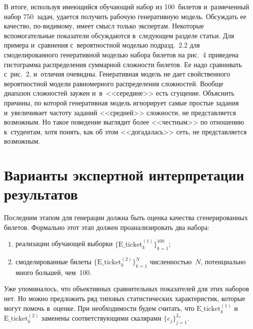 \begin{multicols}{2}
  В итоге, используя имеющийся обучающий набор из 100~билетов 
и~размеченный набор 750~задач, удается получить рабочую генеративную 
модель. Обсуждать ее качество, по-ви\-ди\-мо\-му, имеет смысл только 
экспертам. Некоторые вспомогательные показатели обсуждаются 
в~следующем разделе статьи. Для примера и~сравнения с~вероятностной 
моделью подразд.~2.2 для смоделированного генеративной моделью набора 
билетов на рис.~4 приведена гистограмма распределения суммарной 
сложности билетов. Ее надо сравнивать с~рис.~2, и~отличия очевидны. 
Генеративная модель не дает свойственного вероятностной модели 
равномерного распределения сложностей. Вообще диапазон сложностей 
заужен и~в~<<середине>> есть сгущение. Объяснить причины, по которой 
генеративная модель игнорирует самые простые задания и~увеличивает 
частоту заданий <<сред\-ней>> слож\-ности, не представляется возможным. 
Но такое поведение выглядит более <<чест\-ным>> по отношению 
к~студентам, хотя понять, как об этом <<догадалась>> сеть, не 
представляется возможным.
  
  
 
  
\section{Варианты экспертной интерпретации результатов}

  Последним этапом для генерации должна быть оценка качества 
сгенерированных билетов. Формально этот этап должен проанализировать 
два набора: 
\begin{enumerate}[(1)]
\item реализации обуча\-ющей выборки 
$\{\mathrm{E\_ticket}_k^{(1)}\}_{k=1}^{100}$;
\item смоделированные билеты 
$\{\mathrm{E\_ticket}_k^{(2)}\}^N_{k=1}$ чис\-лен\-ностью~$N$, потенциально много 
большей, чем~100.
\end{enumerate}
 Уже упоминалось, что объективных сравнительных 
показателей для этих наборов нет. Но можно предложить ряд типовых 
статистических характеристик, которые могут помочь в~оценке. При 
необходимости будем считать, что $\mathrm{E\_ticket}_k^{(1)}$ и~$\mathrm{E\_ticket}_k^{(2)}$ 
заменены соответствующими скалярами $\{ e_j\}_{j=1}^{L_e}$.
  

\end{multicols}
